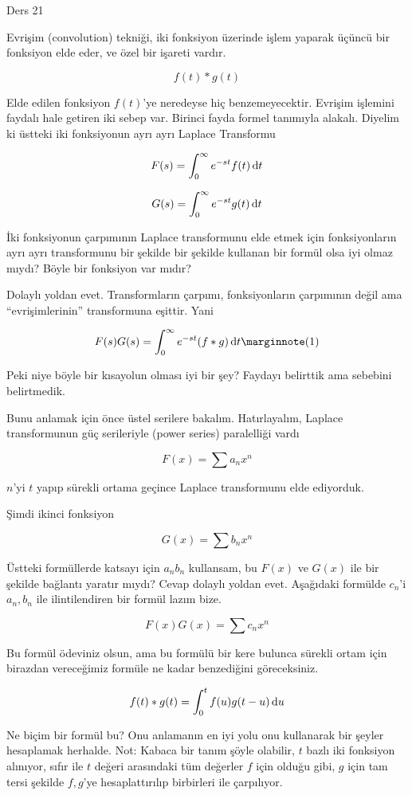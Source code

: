\documentclass[12pt,fleqn]{article}\usepackage{../../common}
\begin{document}
Ders 21

Evrişim (convolution) tekniği, iki fonksiyon üzerinde işlem yaparak üçüncü bir
fonksiyon elde eder, ve özel bir işareti vardır.

$$ f(t) * g(t) $$

Elde edilen fonksiyon $f(t)$'ye neredeyse hiç benzemeyecektir. Evrişim işlemini
faydalı hale getiren iki sebep var. Birinci fayda formel tanımıyla
alakalı. Diyelim ki üstteki iki fonksiyonun ayrı ayrı Laplace Transformu

$$ F(s) = \int_0^{\infty} e^{-st} f(t) \,\mathrm{d} t $$

$$ G(s) = \int_0^{\infty} e^{-st} g(t) \,\mathrm{d} t $$

İki fonksiyonun çarpımının Laplace transformunu elde etmek için fonksiyonların
ayrı ayrı transformunu bir şekilde bir şekilde kullanan bir formül olsa iyi
olmaz mıydı? Böyle bir fonksiyon var mıdır?

Dolaylı yoldan evet. Transformların çarpımı, fonksiyonların çarpımının değil ama
``evrişimlerinin'' transformuna eşittir. Yani

$$
F(s)G(s) =  \int_0^{\infty} e^{-st} (f*g) \ud t 
\mlabel{1}
$$

Peki niye böyle bir kısayolun olması iyi bir şey? Faydayı belirttik ama sebebini
belirtmedik.

Bunu anlamak için önce üstel serilere bakalım. Hatırlayalım, Laplace
transformunun güç serileriyle (power series) paralelliği vardı

$$ F(x) = \sum a_n x^n $$

$n$'yi $t$ yapıp sürekli ortama geçince Laplace transformunu elde
ediyorduk.

Şimdi ikinci fonksiyon

$$ G(x) = \sum b_n x^n $$

Üstteki formüllerde katsayı için $a_nb_n$ kullansam, bu $F(x)$ ve $G(x)$ ile bir
şekilde bağlantı yaratır mıydı? Cevap dolaylı yoldan evet. Aşağıdaki formülde
$c_n$'i $a_n,b_n$ ile ilintilendiren bir formül lazım bize.

$$ F(x)G(x) = \sum c_n x^n $$

Bu formül ödeviniz olsun, ama bu formülü bir kere bulunca sürekli ortam için
birazdan vereceğimiz formüle ne kadar benzediğini göreceksiniz.

$$ f(t)*g(t) = \int_0^t f(u)g(t-u) \,\mathrm{d} u $$

Ne biçim bir formül bu? Onu anlamanın en iyi yolu onu kullanarak bir şeyler
hesaplamak herhalde. Not: Kabaca bir tanım şöyle olabilir, $t$ bazlı iki
fonksiyon alınıyor, sıfır ile $t$ değeri arasındaki tüm değerler $f$ için olduğu
gibi, $g$ için tam tersi şekilde $f,g$'ye hesaplattırılıp birbirleri ile
çarpılıyor.
\end{document}

